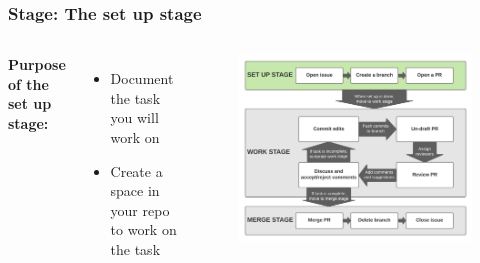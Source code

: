 \documentclass[aspectratio=169]{beamer} %
\begin{document}
\begin{frame}
	\frametitle{Stage: The set up stage}
	\begin{columns}[c]


		\Large \textbf{Purpose of the set up stage:}
		\vspace{1em}
		\normalsize

		\begin{itemize}
			\setlength\itemsep{1em}
			\item Document the task you will work on
			\item Create a space in your repo to work on the task
		\end{itemize}

		\vspace{-.75cm}
		\begin{figure}
			\centering
			\includegraphics[width=\textwidth]{./img/branch-pr-merge-cycle-S1.png}
		\end{figure}

	\end{columns}
\end{frame}
\end{document}
